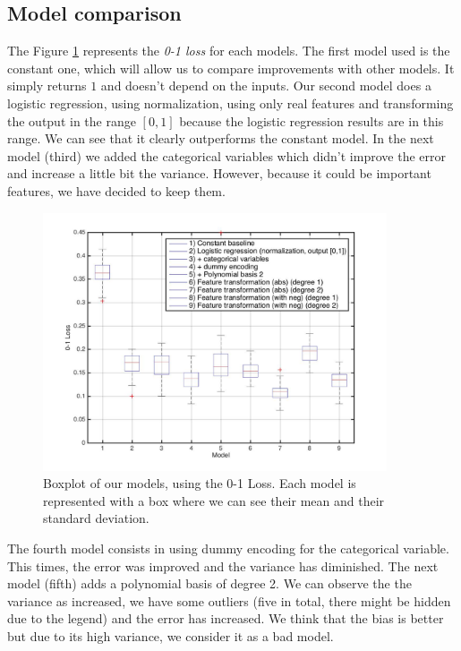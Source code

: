 \documentclass{article} %
\begin{document}
\subsection{Model comparison}

The Figure \ref{fig:models_classification} represents the \textit{0-1 loss} for each models. The first model used is the constant one, which will allow us to compare improvements with other models. It simply returns $1$ and doesn't depend on the inputs. Our second model does a logistic regression, using normalization, using only real features and transforming the output in the range $[0,1]$ because the logistic regression results are in this range. We can see that it clearly outperforms the constant model. In the next model (third) we added the categorical variables which didn't improve the error and increase a little bit the variance. However, because it could be important features, we have decided to keep them.

\begin{figure}
\center
\includegraphics[width=4in]{figures/models_classification.jpg} 
\vspace{-1em}
\caption{Boxplot of our models, using the 0-1 Loss. Each model is represented with a box where we can see their mean and their standard deviation.}
\label{fig:models_classification}
\vspace{-0.5em}
\end{figure}

The fourth model consists in using dummy encoding for the categorical variable. This times, the error was improved and the variance has diminished. The next model (fifth) adds a polynomial basis of degree 2. We can observe the the variance as increased, we have some outliers (five in total, there might be hidden due to the legend) and the error has increased. We think that the bias is better but due to its high variance, we consider it as a bad model.
\end{document}
